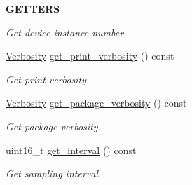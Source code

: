 \begin{Indent}{\bf G\+E\+T\+T\+E\+RS}
\begin{DoxyCompactItemize}
\begin{DoxyCompactList}\small\item\em Get device instance number. \end{DoxyCompactList}\item 
\hyperlink{_misc_8h_abf3be10d03894afb391f3a2935e3b313}{Verbosity} \hyperlink{class_loom_manager_aa97a8e46a133c0d32a3dd8c33d5c9b25}{get\+\_\+print\+\_\+verbosity} () const 
\begin{DoxyCompactList}\small\item\em Get print verbosity. \end{DoxyCompactList}\item 
\hyperlink{_misc_8h_abf3be10d03894afb391f3a2935e3b313}{Verbosity} \hyperlink{class_loom_manager_afaaaf2cec1d6d372b0b6a71720944690}{get\+\_\+package\+\_\+verbosity} () const 
\begin{DoxyCompactList}\small\item\em Get package verbosity. \end{DoxyCompactList}\item 
uint16\+\_\+t \hyperlink{class_loom_manager_a7d282d59fd742664e6bbe33f64241ed3}{get\+\_\+interval} () const 
\begin{DoxyCompactList}\small\item\em Get sampling interval. \end{DoxyCompactList}\end{DoxyCompactItemize}
\end{Indent}
